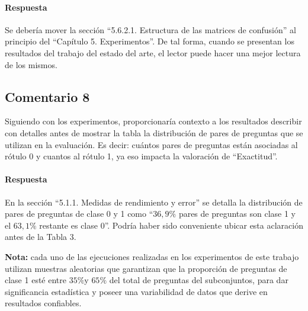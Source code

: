 \paragraph*{Respuesta}
Se debería mover la sección ``5.6.2.1. Estructura de las matrices de confusión'' al principio del ``Capítulo 5. Experimentos''. De tal forma, cuando se presentan los resultados del trabajo del estado del arte, el lector puede hacer una mejor lectura de los mismos.

\subsection*{Comentario 8}
Siguiendo con los experimentos, proporcionaría contexto a los resultados describir con detalles antes de mostrar la tabla la distribución de pares de preguntas que se utilizan en la evaluación. Es decir: cuántos pares de preguntas están asociadas al rótulo 0 y cuantos al rótulo 1, ya eso impacta la valoración de “Exactitud”.

\paragraph*{Respuesta}
En la sección ``5.1.1. Medidas de rendimiento y error'' se detalla la distribución de pares de preguntas de clase 0 y 1 como ``\(36,9\%\) pares de preguntas son clase 1 y el \(63,1\%\) restante es clase 0''. Podría haber sido conveniente ubicar esta aclaración antes de la Tabla 3.

\bigskip

\textbf{Nota:} cada uno de las ejecuciones realizadas en los experimentos de este trabajo utilizan muestras aleatorias que garantizan que la proporción de preguntas de clase 1 esté entre \(35\% \)y \(65\%\) del total de preguntas del subconjuntos, para dar significancia estadística y poseer una variabilidad de datos que derive en resultados confiables.

